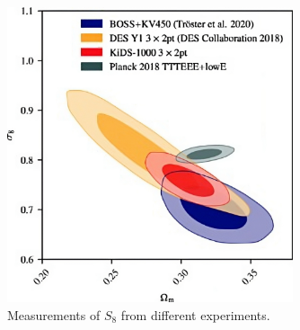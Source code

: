 \begin{figure}[ht]
	\centering
	\includegraphics[width=0.75\textwidth]{plots/s8_tension_4x.jpeg}
	\caption{Measurements of $S_8$ from different experiments.}
	\label{fig:s8_tension}
\end{figure}








